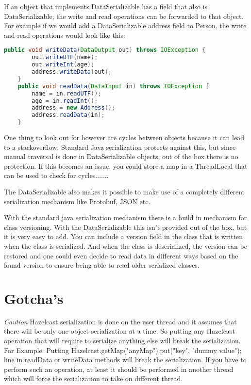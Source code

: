 If an object that implements DataSerializable has a field that also is DataSerializable, the write and read operations can be forwarded to that object. For example if we would add a DataSerializable address field to Person, the write and read operations would look like this:
\begin{lstlisting}[language=java]
    public void writeData(DataOutput out) throws IOException {
        out.writeUTF(name);
        out.writeInt(age);
        address.writeData(out);
    }
    public void readData(DataInput in) throws IOException {
        name = in.readUTF();
        age = in.readInt();
        address = new Address();
        address.readData(in);
    }
\end{lstlisting}
One thing to look out for however are cycles between objects because it can lead to a stackoverflow. 
Standard Java serialization protects against this, but since manual traversal is done in DataSerializable objects, out of the box there is no protection. If this becomes an issue, you could store a map in a ThreadLocal that can be used to check for cycles.......

The DataSerializable also makes it possible to make use of a completely different serialization mechanism like Protobuf, JSON etc.

With the standard java serialization mechanism there is a build in mechanism for class versioning. With the DataSerializable this isn't provided out of the box, but it is very easy to add. You can include a version field in the class that is written when the class is serialized. And when the class is deserialized, the version can be restored and one could even decide to read data in different ways based on the found version to ensure being able to read older serialized classes.

\section{Gotcha's}

\emph{Caution} Hazelcast serialization is done on the user thread and it assumes that there will be only one object serialization at a time. So putting any Hazelcast operation that will require to serialize anything else will break the serialization. For Example: Putting
Hazelcast.getMap("anyMap").put("key", "dummy value");
line in readData or writeData methods will break the serialization. If you have to perform such an operation, at least it should be performed in another thread which will force the serialization to take on different thread.

